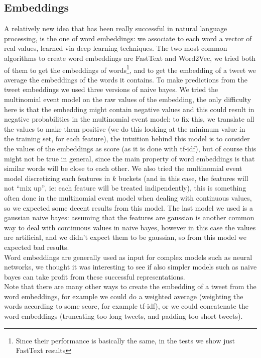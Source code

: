 \subsection*{Embeddings}
A relatively new idea that has been really successful in natural language processing, is the one of word embeddings: we associate to each word a vector of real values, learned via deep learning techniques. The two most common algorithms to create word embeddings are FastText and Word2Vec, we tried both of them to get the embeddings of words\footnote{Since their performance is basically the same, in the tests we show just FastText results}, and to get the embedding of a tweet we average the embeddings of the words it contains. To make predictions from the tweet embeddings we used three versions of naive bayes. We tried the multinomial event model on the raw values of the embedding, the only difficulty here is that the embedding might contain negative values and this could result in negative probabilities in the multinomial event model: to fix this, we translate all the values to make them positive (we do this looking at the minimum value in the training set, for each feature), the intuition behind this model is to consider the values of the embeddings as score (as it is done with tf-idf), but of course this might not be true in general, since the main property of word embeddings is that similar words will be close to each other. We also tried the multinomial event model discretizing each features in $k$ buckets (and in this case, the features will not ``mix up'', ie: each feature will be treated indipendently), this is something often done in the multinomial event model when dealing with continuous values, so we expected some decent results from this model. The last model we used is a gaussian naive bayes: assuming that the features are gaussian is another common way to deal with continuous values in naive bayes, however in this case the values are artificial, and we didn't expect them to be gaussian, so from this model we expected bad results.\\
Word embeddings are generally used as input for complex models such as neural networks, we thought it was interesting to see if also simpler models such as naive bayes can take profit from these successful representations.\\
Note that there are many other ways to create the embedding of a tweet from the word embeddings, for example we could do a weighted average (weighting the words according to some score, for example tf-idf), or we could concatenate the word embeddings (truncating too long tweets, and padding too short tweets).

